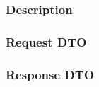 \documentclass[../main.tex]{subfiles}
\begin{document}
\subsubsection*{Description}


\subsubsection*{Request DTO}


\subsubsection*{Response DTO}

\end{document}

